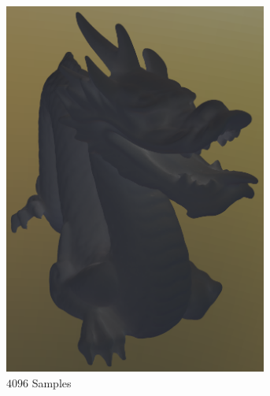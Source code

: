 \begin{figure}[h]
\begin{subfigure}[b]{0.33\textwidth}
				\includegraphics[width=0.95\textwidth]{pic/irr_est-rc-dragon2-s4096-err.png}
				\caption{$4096$ Samples}
			\end{subfigure}
			\begin{subfigure}[b]{0.33\textwidth}
				\center

\end{subfigure}
\end{figure}
